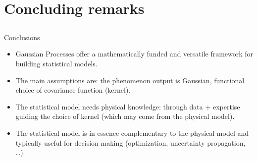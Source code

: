 \section[Conclusions]{Concluding remarks}
\subsection{}
\begin{frame}{}
\begin{exampleblock}{Conclusions}
\begin{itemize}
\item Gaussian Processes offer a mathematically funded and versatile framework for building statistical models.
\item The main assumptions are: the phenomenon output is Gaussian, functional choice of covariance function (kernel).
\item The statistical model needs physical knowledge: through data + expertise guiding the choice of kernel (which may come from the physical model).
\item The statistical model is in essence complementary to the physical model and typically useful 
for decision making (optimization, uncertainty propagation, \dots).
\end{itemize}
\end{exampleblock}

\end{frame}

